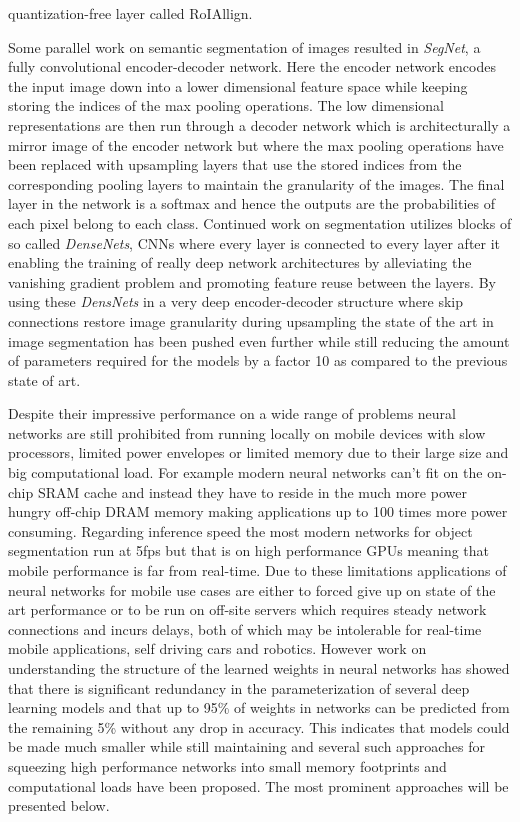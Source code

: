 \documentclass[11pt]{article}
\newcommand{\bibentry}[1]{\cite{#1}}
\begin{document}
quantization-free layer called RoIAllign.

Some parallel work on semantic segmentation of images resulted in \emph{SegNet}\bibentry{badrinarayanan2015segnet}, a fully convolutional encoder-decoder network. Here the encoder network encodes the input image down into a lower dimensional feature space while keeping storing the indices of the max pooling operations. The low dimensional representations are then run through a decoder network which is architecturally a mirror image of the encoder network but where the max pooling operations have been replaced with upsampling layers that use the stored indices from the corresponding pooling layers to maintain the granularity of the images. The final layer in the network is a softmax and hence the outputs are the probabilities of each pixel belong to each class.
Continued work on segmentation utilizes blocks of so called \emph{DenseNets}\bibentry{huang2017densely}, CNNs where every layer is connected to every layer after it enabling the training of really deep network architectures by alleviating the vanishing gradient problem and promoting feature reuse between the layers. By using these \emph{DensNets} in a very deep encoder-decoder structure where skip connections restore image granularity during upsampling the state of the art in image segmentation has been pushed even further \bibentry{jegou2017one} while still reducing the amount of parameters required for the models by a factor 10 as compared to the previous state of art.

Despite their impressive performance on a wide range of problems neural networks are still prohibited from running locally on mobile devices with slow processors, limited power envelopes or limited memory due to their large size and big computational load. For example modern neural networks can't fit on the on-chip SRAM cache and instead they have to reside in the much more power hungry off-chip DRAM memory making applications up to 100 times more power consuming\bibentry{han2015learning}. Regarding inference speed the most modern networks for object segmentation\bibentry{he2017mask} run at 5fps but that is on high performance GPUs meaning that mobile performance is far from real-time. Due to these limitations applications of neural networks for mobile use cases are either to forced give up on state of the art performance or to be run on off-site servers which requires steady network connections and incurs delays, both of which may be intolerable for real-time mobile applications, self driving cars and robotics\bibentry{jin2014flattened}. However work on understanding the structure of the learned weights in neural networks\bibentry{denil2013predicting} has showed that there is significant redundancy in the parameterization of several deep learning models and that up to 95\% of weights in networks can be predicted from the remaining 5\% without any drop in accuracy. This indicates that models could be made much smaller while still maintaining and several such approaches for squeezing high performance networks into small memory footprints and computational loads have been proposed. The most prominent approaches will be presented below. 
\end{document}
